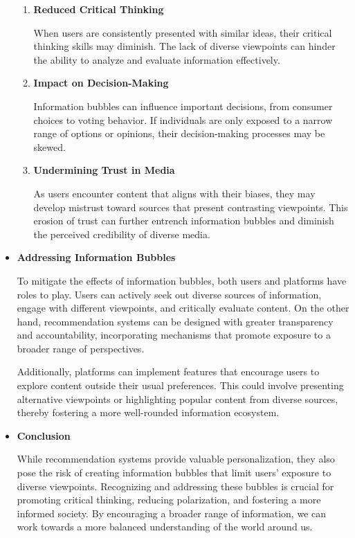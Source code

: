 \documentclass[10pt,twoside,slovak,a4paper]{article}
\begin{document}
\begin{itemize}
\begin{enumerate}
\item \textbf{Reduced Critical Thinking}

When users are consistently presented with similar ideas, their critical thinking skills may diminish\cite{sssr}. The lack of diverse viewpoints can hinder the ability to analyze and evaluate information effectively.


\item \textbf{Impact on Decision-Making}

Information bubbles can influence important decisions, from consumer choices to voting behavior\cite{politics}. If individuals are only exposed to a narrow range of options or opinions, their decision-making processes may be skewed.

\item \textbf{Undermining Trust in Media}

As users encounter content that aligns with their biases, they may develop mistrust toward sources that present contrasting viewpoints\cite{boubble}. This erosion of trust can further entrench information bubbles and diminish the perceived credibility of diverse media.
\end{enumerate}

\newpage
\item \textbf{Addressing Information Bubbles} 

To mitigate the effects of information bubbles, both users and platforms have roles to play. Users can actively seek out diverse sources of information, engage with different viewpoints, and critically evaluate content. On the other hand, recommendation systems can be designed with greater transparency and accountability, incorporating mechanisms that promote exposure to a broader range of perspectives\cite{youtube}.

Additionally, platforms can implement features that encourage users to explore content outside their usual preferences\cite{youtube}. This could involve presenting alternative viewpoints or highlighting popular content from diverse sources, thereby fostering a more well-rounded information ecosystem.

\item \textbf{Conclusion} 

While recommendation systems provide valuable personalization, they also pose the risk of creating information bubbles that limit users' exposure to diverse viewpoints. Recognizing and addressing these bubbles is crucial for promoting critical thinking, reducing polarization, and fostering a more informed society. By encouraging a broader range of information, we can work towards a more balanced understanding of the world around us.
\end{itemize}
\end{document}
